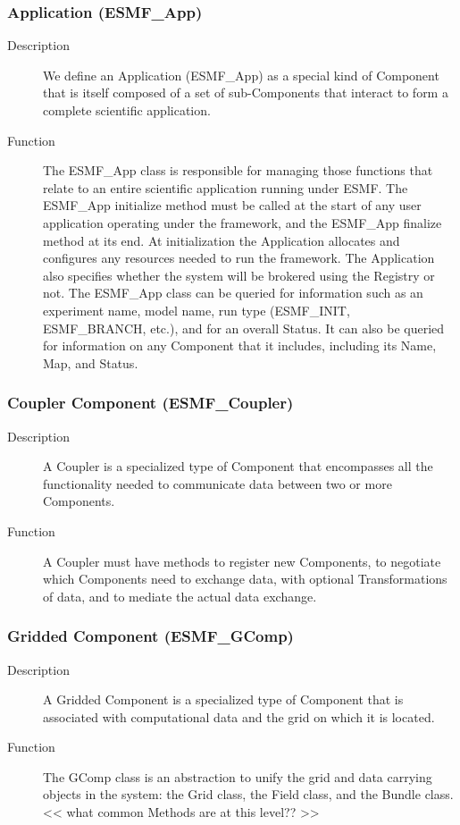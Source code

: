 \subsubsection{Application (ESMF\_App)}
\begin{description} 
\item [Description] We define an Application (ESMF\_App) as a special kind of Component 
that is itself composed of a set of sub-Components that interact to form a complete scientific
application.  
\item [Function] The ESMF\_App class is responsible for managing those functions that relate 
to an entire scientific application running under ESMF.  The ESMF\_App initialize method 
must be called at the start of any user application operating under the framework, and
the ESMF\_App finalize method at its end.  At initialization the Application allocates and 
configures any resources needed to run the framework.  The Application also specifies whether 
the system will be brokered using the Registry or not.  The ESMF\_App class can be queried 
for information such as an experiment name, model name, run type (ESMF\_INIT, 
ESMF\_BRANCH, etc.), and for an overall Status.  It can also be queried for
information on any Component that it includes, including its Name, Map, and
Status.
\end{description}

\subsubsection{Coupler Component (ESMF\_Coupler)}
\begin{description}
\item [Description] A Coupler is a specialized type of Component that encompasses all the 
functionality needed to communicate data between two or more Components. 
\item [Function] A Coupler must have methods to register new Components, to negotiate
which Components need to exchange data, with optional Transformations of data, and to
mediate the actual data exchange.
\end{description}

\subsubsection{Gridded Component (ESMF\_GComp)}
\label{sec:griddedcomponent} 
\begin{description}
\item [Description] A Gridded Component is a specialized type of Component that is associated
with computational data and the grid on which it is located.
\item [Function] The GComp class is an abstraction to unify the grid and data carrying
objects in the system: the Grid class, the Field class, and the Bundle class.
<< what common Methods are at this level?? >>
\end{description}

